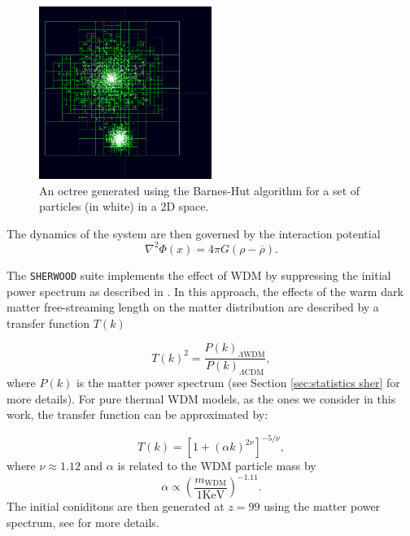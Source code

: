 \begin{figure}
        \centering
        \includegraphics[width=0.5\textwidth]{img/ML/Barnes_hut_tree.png}
        \caption{An octree generated using the Barnes-Hut algorithm for a set of particles (in white) in a 2D space.}
        \label{fig: 2D Barnes Hut}     
\end{figure}

The  dynamics of the system are then governed by the interaction potential
\begin{equation}
        \nabla^2\varPhi(x)=4\pi G(\rho-\overline{\rho}).
\end{equation}

The \texttt{SHERWOOD} suite implements the effect of WDM by suppressing the initial power spectrum as described in \cite{Viel_2005}. In this approach, the effects of the warm dark matter free-streaming length on the matter distribution are described by a transfer function $T(k)$

\begin{equation}
        T(k)^2=\frac{P(k)_{\Lambda\mathrm{WDM}}}{P(k)_{\Lambda\mathrm{CDM}}},
\end{equation}
where $P(k)$ is the matter power spectrum (see Section \ref{sec:statistics sher} for more details). For pure thermal WDM models, as the ones we consider in this work, the transfer function can be approximated by:

\begin{equation}
        T(k)=[1+(\alpha k)^{2\nu}]^{-5/\nu},
\end{equation}
where $\nu\approx 1.12$ and $\alpha$ is related to the WDM particle mass by
\begin{equation}
        \alpha \propto \left( \frac{m_\mathrm{WDM}}{1 \mathrm{KeV}} \right)^{-1.11}.
\end{equation}
The initial coniditons are then generated at $z=99$ using the matter power spectrum, see \cite{Bolton_2016} for more details.

